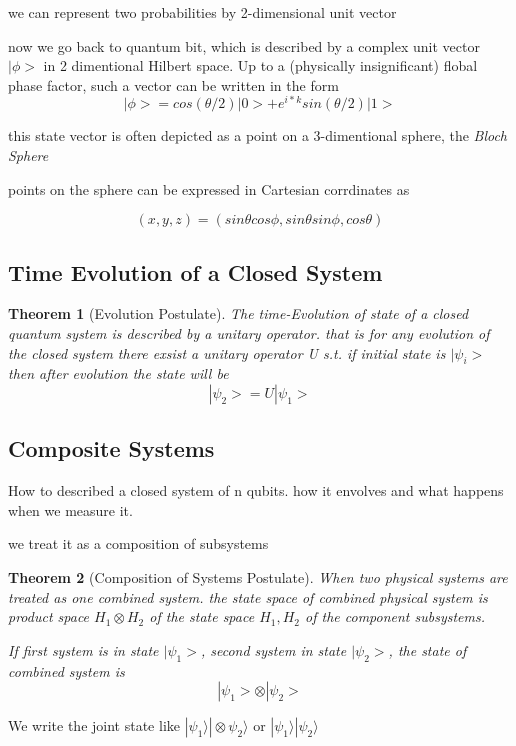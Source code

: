 \documentclass[10pt]{article}
\theoremstyle{break}
\newtheorem{thm}{Theorem}[subsection]
\begin{document}
we can represent two probabilities by 2-dimensional unit vector 

now we go back to quantum bit, which is described by a complex unit vector 
$|\phi>$ in 2 dimentional Hilbert space. Up to a (physically insignificant)
flobal phase factor, such a vector can be written in the form 
    $$|\phi>=cos(\theta/2)|0> + e^{i*k}sin(\theta/2)|1>$$

this state vector is often depicted as a point on a 3-dimentional sphere, the \emph{Bloch Sphere}

points on the sphere can be expressed in Cartesian corrdinates as 

$$(x,y,z)=(sin\theta cos\phi, sin\theta sin\phi, cos\theta)$$

\subsection{Time Evolution of a Closed System}

\begin{thm}[Evolution Postulate]
    The time-Evolution of state of a \emph{closed} quantum system 
    is described by a unitary operator. that is for any evolution of 
    the closed system there exsist a unitary operator U s.t. if initial state 
    is $|\psi_i>$ then after evolution the state will be 
    $$|\psi_2> = U |\psi_1>$$
\end{thm}

\subsection{Composite Systems}

How to described a closed system of n qubits. how it envolves and what happens when we measure it. 

we treat it as a composition of subsystems

\begin{thm}[Composition of Systems Postulate]
    When two physical systems are treated as one combined system.
    the state space of combined physical system is product space $H_1\otimes H_2$ of 
    the state space $H_1, H_2$ of the component subsystems.

    If first system is in state $|\psi_1>$, second system in state $|\psi_2>$,
    the state of combined system is $$|\psi_1>\otimes |\psi_2>$$
\end{thm}

We write the joint state like $|\psi_1\rangle|\otimes\psi_2\rangle$ or $|\psi_1\rangle|\psi_2\rangle$
\end{document}
